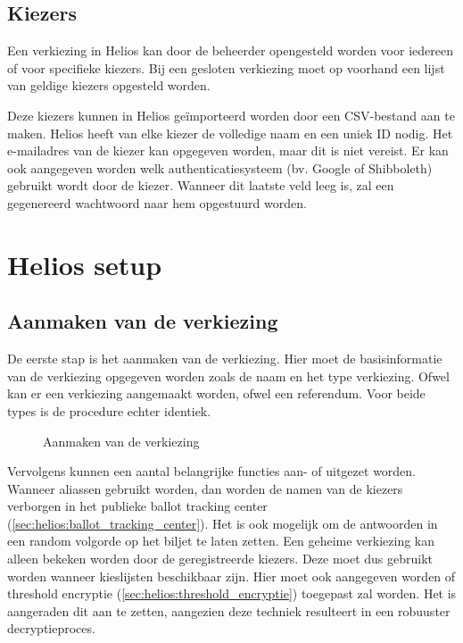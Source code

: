 \subsection{Kiezers}
\label{sec:proc:voorbereiding:kiezers}

Een verkiezing in Helios kan door de beheerder opengesteld worden voor iedereen of voor specifieke kiezers. Bij een gesloten verkiezing moet op voorhand een lijst van geldige kiezers opgesteld worden.

\npar Deze kiezers kunnen in Helios ge\"importeerd worden door een CSV-bestand aan te maken. Helios heeft van elke kiezer de volledige naam en een uniek ID nodig. Het e-mailadres van de kiezer kan opgegeven worden, maar dit is niet vereist. Er kan ook aangegeven worden welk authenticatiesysteem (bv. Google of Shibboleth) gebruikt wordt door de kiezer. Wanneer dit laatste veld leeg is, zal een gegenereerd wachtwoord naar hem opgestuurd worden.

\section{Helios setup}
\label{sec:proc:helios}

\subsection{Aanmaken van de verkiezing}

De eerste stap is het aanmaken van de verkiezing. Hier moet de basisinformatie van de verkiezing opgegeven worden zoals de naam en het type verkiezing. Ofwel kan er een verkiezing aangemaakt worden, ofwel een referendum. Voor beide types is de procedure echter identiek.

\begin{figure}
  \caption{Aanmaken van de verkiezing}
  \label{fig:proc:elections_new}
\end{figure}

\npar Vervolgens kunnen een aantal belangrijke functies aan- of uitgezet worden. Wanneer aliassen gebruikt worden, dan worden de namen van de kiezers verborgen in het publieke ballot tracking center (\ref{sec:helios:ballot_tracking_center}). Het is ook mogelijk om de antwoorden in een random volgorde op het biljet te laten zetten. Een geheime verkiezing kan alleen bekeken worden door de geregistreerde kiezers. Deze moet dus gebruikt worden wanneer kieslijsten beschikbaar zijn. Hier moet ook aangegeven worden of threshold encryptie  (\ref{sec:helios:threshold_encryptie}) toegepast zal worden. Het is aangeraden dit aan te zetten, aangezien deze techniek resulteert in een robuuster decryptieproces.

